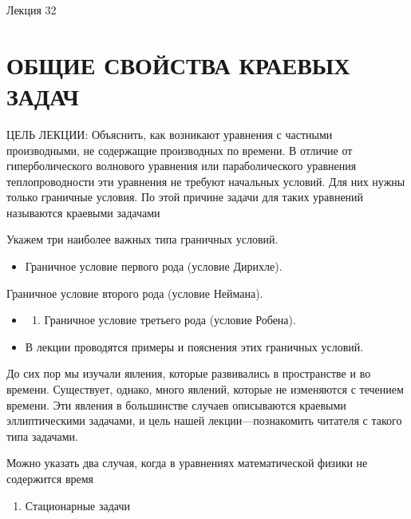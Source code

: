 \documentclass[
  ukrainian,
]{article}
\providecommand{\tightlist}{%
  \setlength{\itemsep}{0pt}\setlength{\parskip}{0pt}}
\begin{document}
Лекция 32

\section{ОБЩИЕ СВОЙСТВА КРАЕВЫХ
ЗАДАЧ}\label{ux43eux431ux449ux438ux435-ux441ux432ux43eux439ux441ux442ux432ux430-ux43aux440ux430ux435ux432ux44bux445-ux437ux430ux434ux430ux447}

ЦЕЛЬ ЛЕКЦИИ: Объяснить, как возникают уравнения с частными производными,
не содержащие производных по времени. В отличие от гиперболического
волнового уравнения или параболического уравнения теплопроводности эти
уравнения не требуют начальных условий. Для них нужны только граничные
условия. По этой причине задачи для таких уравнений называются краевыми
задачами

Укажем три наиболее важных типа граничных условий.

\begin{itemize}
\tightlist
\item
  Граничное условие первого рода (условие Дирихле).
\end{itemize}

Граничное условие второго рода (условие Неймана).

\begin{itemize}
\tightlist
\item
  \begin{enumerate}
  \def\labelenumi{\arabic{enumi}.}
  \setcounter{enumi}{2}
  \tightlist
  \item
    Граничное условие третьего рода (условие Робена).
  \end{enumerate}
\item
  В лекции проводятся примеры и пояснения этих граничных условий.
\end{itemize}

До сих пор мы изучали явления, которые развивались в пространстве и во
времени. Существует, однако, много явлений, которые не изменяются с
течением времени. Эти явления в большинстве случаев описываются краевыми
эллиптическими задачами, и цель нашей лекции---познакомить читателя с
такого типа задачами.

Можно указать два случая, когда в уравнениях математической физики не
содержится время

\begin{enumerate}
\def\labelenumi{\arabic{enumi}.}
\tightlist
\item
  Стационарные задачи
\end{enumerate}
\end{document}
